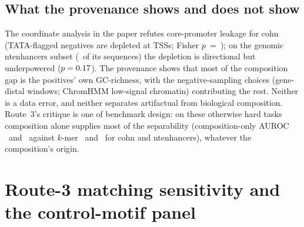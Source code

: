\documentclass[journal,onecolumn,10pt,letterpaper]{IEEEtran}
\newcommand{\tasku}{\textunderscore\allowbreak}
\DeclareRobustCommand{\task}[1]{{\normalfont\ttfamily\upshape\let\_\tasku #1}}
\begin{document}
\subsection{What the provenance shows and does not show}\label{sec:s3wider}
The coordinate analysis in the paper refutes core-promoter leakage for \task{cohn} (TATA-flagged
negatives are depleted at TSSs; Fisher $p$~=~\smCohnTssP); on the genomic \task{nt\_enhancers} subset
(\smNtMapped\ of its sequences) the depletion is directional but underpowered ($p=0.17$). The
provenance shows that most
of the composition gap is the positives' own GC-richness, with the negative-sampling choices
(gene-distal windows; ChromHMM low-signal chromatin) contributing the rest. Neither is a data error,
and neither separates artifactual from biological composition. Route~3's critique is one of benchmark
design: on these otherwise hard tasks composition alone supplies most of the separability
(composition-only AUROC \smCompZero\ and \smCompZeroNt\ against $k$-mer \smAzero\ and \smAzeroNt\ for
\task{cohn} and \task{nt\_enhancers}), whatever the composition's origin.

\section{Route-3 matching sensitivity and the control-motif panel}\label{sec:s4}
\end{document}

